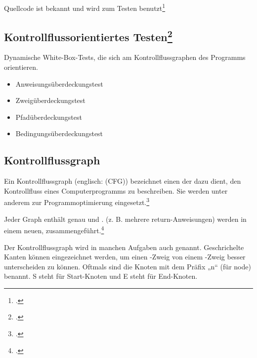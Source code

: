 \documentclass{lehramt-informatik}
\begin{document}
\begin{quellen}
\item \cite{wiki:white-box-test}
\item \cite[Seite 199-246]{hoffmann}
\end{quellen}

Quellcode ist bekannt und wird
zum Testen benutzt\footcite[Seite 32]{sosy:fs:5}

%

\subsection{Kontrollflussorientiertes Testen\footcite[Seite 34]{sosy:fs:5}}

\begin{quellen}
\item \cite{wiki:kontrollfluss-test}
\item \cite[Kapitel 8.6.3 „Methoden zur Testfallermittlung“, Seite 251-252]{schneider}
\end{quellen}

Dynamische White-Box-Tests, die sich am Kontrollflussgraphen des
Programms orientieren.

\begin{itemize}
\item Anweisungsüberdeckungstest
\item Zweigüberdeckungstest
\item Pfadüberdeckungstest
\item Bedingungsüberdeckungstest
\end{itemize}

%

\subsection{Kontrollflussgraph}

Ein Kontrollflussgraph (englisch:  (CFG))
bezeichnet einen  der dazu dient, den
Kontrollfluss eines Computerprogramms zu beschreiben. Sie werden unter
anderem zur Programmoptimierung
eingesetzt.\footcite{wiki:kontrollflussgraph}

Jeder Graph enthält genau  und .  (z. B. mehrere
return-Anweisungen) werden in einem neuen,  zusammengeführt.\footcite[Seite
203]{hoffmann}

Der Kontrollflussgraph wird in manchen Aufgaben auch
 genannt. Geschrichelte Kanten können
eingezeichnet werden, um einen -Zweig von einem
-Zweig besser unterscheiden zu können. Oftmals sind die
Knoten mit dem Präfix „n“ (für node) benannt. S steht für Start-Knoten
und E steht für End-Knoten.
\end{document}
